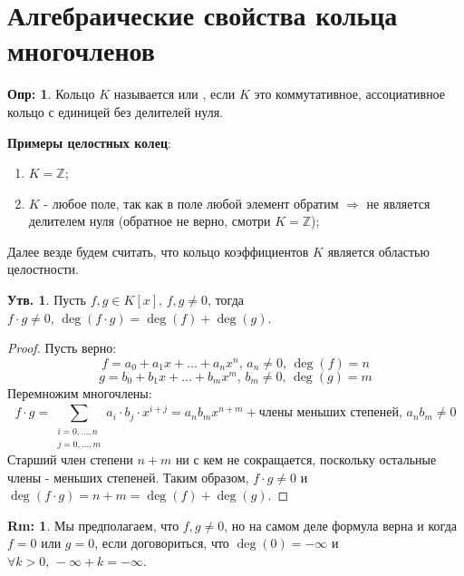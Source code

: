 \documentclass[12pt]{article}
\newcommand{\MZ}{\mathbb{Z}}
\theoremstyle{definition}
\newtheorem{defn}{Опр:}
\newtheorem{rem}{Rm:}
\newtheorem{prop}{Утв.}
\newcommand{\ddsum}[2]{\displaystyle\sum\limits_{#1}^{#2}}
\begin{document}
\section*{Алгебраические свойства кольца многочленов}
\begin{defn}
	Кольцо $K$ называется  или , если $K$ это коммутативное, ассоциативное кольцо с единицей без делителей нуля.
\end{defn}
\textbf{Примеры целостных колец}:
\begin{enumerate}[label=\arabic*)]
	\item $K = \MZ$;
	\item $K$ - любое поле, так как в поле любой элемент обратим $\Rightarrow$ не является делителем нуля (обратное не верно, смотри $K = \MZ$);
\end{enumerate}
Далее везде будем считать, что кольцо коэффициентов $K$ является областью целостности.

\begin{prop}
	Пусть $f,g \in K[x], \, f,g \neq 0$, тогда $f{\cdot}g \neq 0, \, \deg(f{\cdot}g) = \deg(f) + \deg(g)$.
\end{prop}
\begin{proof}
	Пусть верно:
	$$
		f = a_0 + a_1x + \dotsc + a_n x^n, \, a_n \neq 0, \, \deg(f) = n
	$$
	$$
		g = b_0 + b_1x + \dotsc  + b_m x^m, \, b_m \neq 0, \, \deg(g) = m
	$$
	Перемножим многочлены:
	$$
		f{\cdot}g = \ddsum{\substack{i = 0,\dotsc,n\\j = 0,\dotsc,m}}{}a_i{\cdot}b_j{\cdot}x^{i + j} = a_nb_mx^{n + m} + \text{члены меньших степеней}, \, a_nb_m \neq 0
	$$
	Старший член степени $n + m$ ни с кем не сокращается, поскольку остальные члены - меньших степеней. Таким образом, $f{\cdot}g \neq 0$ и $\deg(f{\cdot}g) = n + m = \deg(f) + \deg(g)$.
\end{proof}
\begin{rem}
	Мы предполагаем, что $f,g \neq 0$, но на самом деле формула верна и когда $f = 0$ или $g = 0$, если договориться, что $\deg(0) = -\infty$ и $\forall k > 0, \, -\infty + k = -\infty$.
\end{rem}
\end{document}

